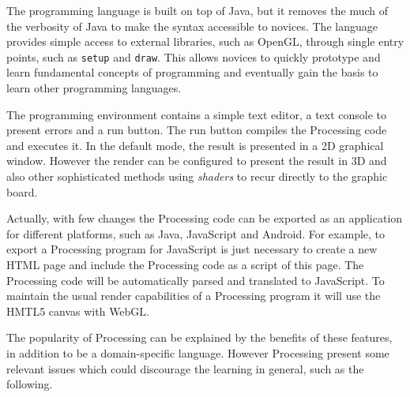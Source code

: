 The programming language is built on top of Java, but it removes the much of the verbosity of Java to make the syntax accessible to novices. The language provides simple access to external libraries, such as OpenGL, through single entry points, such as \texttt{setup} and \texttt{draw}. This allows novices to quickly prototype and learn fundamental concepts of programming and eventually gain the basis to learn other programming languages.

The programming environment contains a simple text editor, a text console to present errors and a run button. The run button compiles the Processing code and executes it. In the default mode, the result is presented in a 2D graphical window. However the render can be configured to present the result in 3D and also other sophisticated methods using \textit{shaders} to recur directly to the graphic board. 

Actually, with few changes the Processing code can be exported as an application for different platforms, such as Java, JavaScript and Android. For example, to export a Processing program for JavaScript is just necessary to create a new HTML page and include the Processing code as a script of this page. The Processing code will be automatically parsed and translated to JavaScript. To maintain the usual render capabilities of a Processing program it will use the HMTL5 canvas with WebGL.

The popularity of Processing can be explained by the benefits of these features, in addition to be a domain-specific language. However Processing present some relevant issues which could discourage the learning in general, such as the following.

